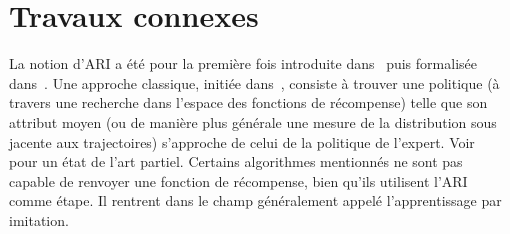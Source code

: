 \documentclass[english,utf8]{./hermes-journal}
\begin{document}

\section{Travaux connexes}
\label{sec:relatedWorks}

La notion d'ARI a été pour la première fois introduite dans~\cite{Russell:1998}
puis formalisée dans~\cite{Ng:2000}. Une approche classique, initiée dans~\cite{Abbeel:2004}, consiste à trouver une politique (à travers une recherche dans l'espace des fonctions de récompense) telle que son attribut moyen (ou de manière plus générale une mesure de la distribution sous jacente aux trajectoires) s'approche de celui de la politique de l'expert.
%
Voir~\cite{Neu:2010} pour un état de l'art partiel.
%
%
Certains algorithmes mentionnés ne sont pas capable de renvoyer une fonction de récompense, bien qu'ils utilisent l'ARI comme étape. Il rentrent dans le champ généralement appelé l'apprentissage par imitation.
%
\end{document}
